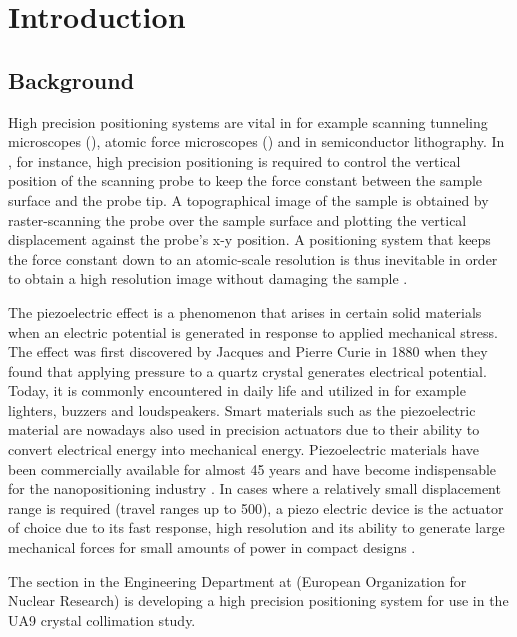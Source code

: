 \chapter{Introduction}\label{cha:intro}

\section{Background}
High precision positioning systems are vital in for example scanning tunneling microscopes (\abbrSTM), atomic force microscopes (\abbrAFM) and in semiconductor lithography. In \abbrAFM, for instance, high precision positioning is required to control the vertical position of the scanning probe to keep the force constant between the sample surface and the probe tip. A topographical image of the sample is obtained by raster-scanning the probe over the sample surface and plotting the vertical displacement against the probe's x-y position. A positioning system that keeps the force constant down to an atomic-scale resolution is thus inevitable in order to obtain a high resolution image without damaging the sample \citep{SurveyOfControlIssues:2007}.

The piezoelectric effect is a phenomenon that arises in certain solid materials when an electric potential is generated in response to applied mechanical stress. The effect was first discovered by Jacques and Pierre Curie in 1880 when they found that applying pressure to a quartz crystal generates electrical potential. Today, it is commonly encountered in daily life and utilized in for example lighters, buzzers and loudspeakers. Smart materials such as the piezoelectric material are nowadays also used in precision actuators due to their ability to convert electrical energy into mechanical energy. Piezoelectric materials have been commercially available for almost 45 years and have become indispensable for the nanopositioning industry \citep{Piezo:2008}. In cases where a relatively small displacement range is required (travel ranges up to \unit{500}{\micro\meter}), a piezo electric device is the actuator of choice due to its fast response, high resolution and its ability to generate large mechanical forces for small amounts of power in compact designs \citep{SurveyOfControlIssues:2007}.

The \abbrENSTIECE section in the Engineering Department at \abbrCERN (European Organization for Nuclear Research) is developing a high precision positioning system for use in the UA9 crystal collimation study.

